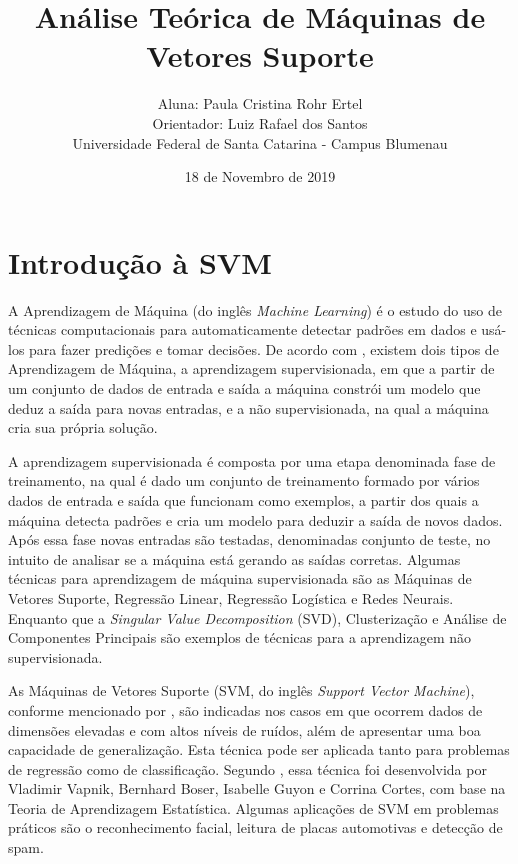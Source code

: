 \documentclass[12pt,a4paper]{scrartcl}
\theoremstyle{definition}%
\begin{document}
\title{Análise Teórica de Máquinas de Vetores Suporte} 
\author{ \normalfont Aluna: Paula Cristina Rohr Ertel \\ \normalfont Orientador: Luiz Rafael dos Santos \\ \normalfont Universidade Federal de Santa Catarina - Campus Blumenau}
\date{18 de Novembro de 2019}
\maketitle
\section{Introdução à SVM}

A Aprendizagem de Máquina (do inglês \textit{Machine Learning}) é o estudo do uso de técnicas computacionais para automaticamente detectar padrões em dados e usá-los para fazer predições e tomar decisões. De acordo com \textcite{Evelin2017}, existem dois tipos de Aprendizagem de Máquina, a aprendizagem supervisionada, em que a partir de um conjunto de dados de entrada e saída a máquina constrói um modelo que deduz a saída para novas entradas, e a não supervisionada, na qual a máquina cria sua própria solução. 

A aprendizagem supervisionada é composta por uma etapa denominada fase de treinamento, na qual é dado um conjunto de treinamento formado por vários dados de entrada e saída que funcionam como exemplos, a partir dos quais a máquina detecta padrões e cria um modelo para deduzir a saída de novos dados. Após essa fase novas entradas são testadas, denominadas conjunto de teste, no intuito de analisar se a máquina está gerando as saídas corretas. Algumas técnicas para aprendizagem de máquina supervisionada são as Máquinas de Vetores Suporte, Regressão Linear, Regressão Logística e Redes Neurais. Enquanto que a \textit{Singular Value Decomposition} (SVD), Clusterização e Análise de Componentes Principais \cite{Evelin2017} são exemplos de técnicas para a aprendizagem não supervisionada. 

As Máquinas de Vetores Suporte (SVM, do inglês \textit{Support Vector Machine}), conforme mencionado por \textcite{Evelin2017}, são indicadas nos casos em que ocorrem dados de dimensões elevadas e com altos níveis de ruídos, além de apresentar uma boa capacidade de generalização. Esta técnica pode ser aplicada tanto para problemas de regressão como de classificação. Segundo \textcite{Evelin2017}, essa técnica foi desenvolvida por Vladimir Vapnik, Bernhard Boser, Isabelle Guyon e Corrina Cortes, com base na Teoria de Aprendizagem Estatística. Algumas aplicações de SVM em problemas práticos são o reconhecimento facial, leitura de placas automotivas e detecção de spam.
\end{document}
